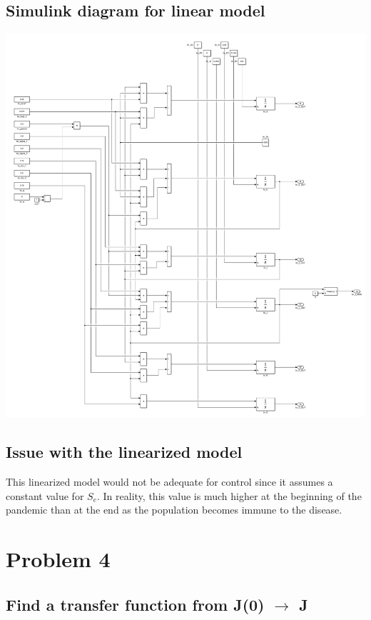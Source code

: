 \documentclass[fleqn]{article}
\begin{document}
\subsection*{Simulink diagram for linear model}
\begin{center}
    \includegraphics[width=\linewidth]{linear_simulink_diagram}
\end{center}

\subsection*{Issue with the linearized model}
This linearized model would not be adequate for control since it assumes a constant value for $S_e$. In reality, this value is much higher at the beginning of the pandemic than at the end as the population becomes immune to the disease.

\section*{Problem 4}
\subsection*{Find a transfer function from J(0) $\rightarrow$ J}
\end{document}
